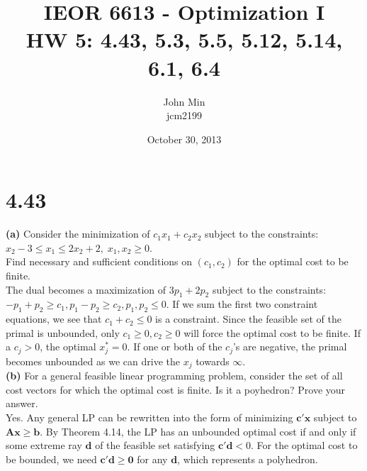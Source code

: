 \documentclass{article}
\begin{document}
\title{IEOR 6613 - Optimization I\\ HW 5:  4.43, 5.3, 5.5, 5.12, 5.14, 6.1, 6.4}

\author{John Min\\ jcm2199}
\date{October 30, 2013}
\maketitle

\section*{4.43}

\textbf{(a)}  Consider the minimization of $c_1 x_1 + c_2 x_2$ subject to the constraints:
$x_2 - 3 \leq x_1 \leq 2 x_2 +2, \; x_1, x_2 \geq 0$. \\
\noindent 
Find necessary and sufficient conditions on $(c_1, c_2)$ for the optimal cost to be finite.\\

\noindent
The dual becomes a maximization of $3 p_1 + 2 p_2$ subject to the constraints: $- p_1 + p_2 \geq c_1, p_1 - p_2 \geq c_2, p_1, p_2 \leq 0$.  If we sum the first two constraint equations, we see that $c_1 + c_2 \leq 0$ is a constraint.  Since the feasible set of the primal is unbounded, only $c_1 \geq 0, c_2 \geq 0$ will force the optimal cost to be finite.  If a $c_j > 0$, the optimal $x^*_j = 0$.  If one or both of the $c_j$'s are negative, the primal becomes unbounded as we can drive the $x_j$ towards $\infty$. \\


\noindent
\textbf{(b)}
For a general feasible linear programming problem, consider the set of all cost vectors for which the optimal cost is finite.  Is it a poyhedron?  Prove your answer. \\

\noindent
Yes.  Any general LP can be rewritten into the form of minimizing $\mathbf{c'x}$ subject to $\mathbf{Ax \geq b}$.  By Theorem 4.14, the LP has an unbounded optimal cost if and only if some extreme ray $\mathbf{d}$ of the feasible set satisfying $\mathbf{c'd} < 0$.  For the optimal cost to be bounded, we need $\mathbf{c'd \geq 0}$ for any $\mathbf{d}$, which represents a polyhedron. \\
\end{document}

